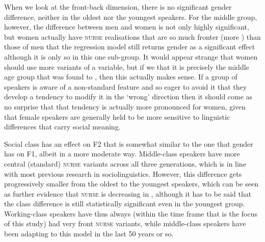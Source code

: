 When we look at the front-back dimension, there is no significant gender difference, neither in the oldest nor the youngest speakers.
For the middle group, however, the difference between men and women is not only highly significant, but women actually have \textsc{nurse} realisations that are so much fronter (more ) than those of men that the regression model still returns gender as a significant effect although it is only so in this one sub-group.
It would appear strange that women should use more  variants of a  variable, but if we  that it is precisely the middle age group that was found to , then this actually makes sense.
If a group of speakers is aware of a non-standard feature and so eager to avoid it that they develop a tendency to modify it in the `wrong' direction then it should come as no surprise that that tendency is actually more pronounced for women, given that female speakers are generally held to be more sensitive to linguistic differences that carry social meaning.

Social class has an effect on F2 that is somewhat similar to the one that gender has on F1, albeit in a more moderate way.
Middle-class speakers have more central (standard) \textsc{nurse} variants across all three generations, which is in line with most previous research in sociolinguistics.
However, this difference gets progressively smaller from the oldest to the youngest speakers, which can be seen as further evidence that \textsc{nurse} is decreasing in , although it has to be said that the class difference is still statistically significant even in the youngest group.
Working-class speakers have thus always (within the time frame that is the focus of this study) had very front \textsc{nurse} variants, while middle-class speakers have been adapting to this model in the last 50 years or so.

